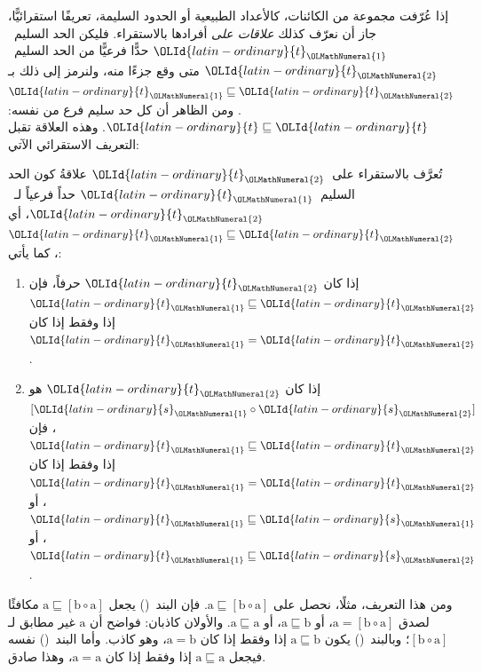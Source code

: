 \documentclass[../../../include/open-logic-section]{subfiles}
\begin{document}


إذا عُرّفت مجموعة من الكائنات، كالأعداد الطبيعية أو الحدود السليمة،
تعريفًا استقرائيًّا، جاز أن نعرّف كذلك \emph{علاقات على} أفرادها
بالاستقراء. فليكن الحد السليم~${\OLId{latin-ordinary}{t}}_{\OLMathNumeral{1}}$ حدًّا فرعيًّا من الحد السليم~${\OLId{latin-ordinary}{t}}_{\OLMathNumeral{2}}$
متى وقع جزءًا منه، ولنرمز إلى ذلك بـ${\OLId{latin-ordinary}{t}}_{\OLMathNumeral{1}} \sqsubseteq {\OLId{latin-ordinary}{t}}_{\OLMathNumeral{2}}$. ومن الظاهر
أن كل حد سليم فرع من نفسه: ${\OLId{latin-ordinary}{t}} \sqsubseteq {\OLId{latin-ordinary}{t}}$. وهذه العلاقة تقبل
التعريف الاستقرائي الآتي:

\begin{defn}
  تُعرَّف بالاستقراء على~${\OLId{latin-ordinary}{t}}_{\OLMathNumeral{2}}$ علاقةُ كون الحد السليم~${\OLId{latin-ordinary}{t}}_{\OLMathNumeral{1}}$ حداً فرعياً
  لـ~${\OLId{latin-ordinary}{t}}_{\OLMathNumeral{2}}$، أي ${\OLId{latin-ordinary}{t}}_{\OLMathNumeral{1}} \sqsubseteq {\OLId{latin-ordinary}{t}}_{\OLMathNumeral{2}}$، كما يأتي:
  \begin{enumerate}
  \item إذا كان ${\OLId{latin-ordinary}{t}}_{\OLMathNumeral{2}}$ حرفاً، فإن ${\OLId{latin-ordinary}{t}}_{\OLMathNumeral{1}} \sqsubseteq {\OLId{latin-ordinary}{t}}_{\OLMathNumeral{2}}$ إذا وفقط إذا كان
    ${\OLId{latin-ordinary}{t}}_{\OLMathNumeral{1}} = {\OLId{latin-ordinary}{t}}_{\OLMathNumeral{2}}$.
  \item إذا كان ${\OLId{latin-ordinary}{t}}_{\OLMathNumeral{2}}$ هو $[{\OLId{latin-ordinary}{s}}_{\OLMathNumeral{1}} \circ {\OLId{latin-ordinary}{s}}_{\OLMathNumeral{2}}]$، فإن
    ${\OLId{latin-ordinary}{t}}_{\OLMathNumeral{1}} \sqsubseteq {\OLId{latin-ordinary}{t}}_{\OLMathNumeral{2}}$ إذا وفقط إذا كان ${\OLId{latin-ordinary}{t}}_{\OLMathNumeral{1}} = {\OLId{latin-ordinary}{t}}_{\OLMathNumeral{2}}$، أو
    ${\OLId{latin-ordinary}{t}}_{\OLMathNumeral{1}} \sqsubseteq {\OLId{latin-ordinary}{s}}_{\OLMathNumeral{1}}$، أو ${\OLId{latin-ordinary}{t}}_{\OLMathNumeral{1}} \sqsubseteq {\OLId{latin-ordinary}{s}}_{\OLMathNumeral{2}}$.
  \end{enumerate}
\end{defn}

ومن هذا التعريف، مثلًا، نحصل على $
\mathrm{a} \sqsubseteq [\mathrm{b} \circ \mathrm{a}]$. فإن البند~()
يجعل $
\mathrm{a} \sqsubseteq [\mathrm{b} \circ \mathrm{a}]$ مكافئًا لصدق
$\mathrm{a} = [\mathrm{b} \circ \mathrm{a}]$، أو
$\mathrm{a} \sqsubseteq \mathrm{b}$، أو
$\mathrm{a} \sqsubseteq \mathrm{a}$. والأولان كاذبان: فواضح أن
$\mathrm{a}$ غير مطابق لـ$[\mathrm{b} \circ \mathrm{a}]$؛ وبالبند~()
يكون $\mathrm{a} \sqsubseteq \mathrm{b}$ إذا وفقط إذا كان
$\mathrm{a} = \mathrm{b}$، وهو كاذب. وأما البند~() نفسه فيجعل
$\mathrm{a} \sqsubseteq \mathrm{a}$ إذا وفقط إذا كان
$\mathrm{a} = \mathrm{a}$، وهذا صادق.
\end{document}
